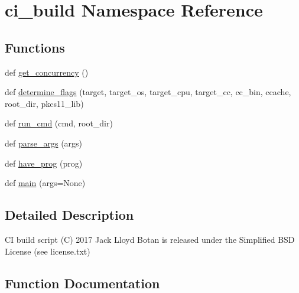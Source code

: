 \hypertarget{namespaceci__build}{}\section{ci\+\_\+build Namespace Reference}
\label{namespaceci__build}
\subsection*{Functions}
\begin{DoxyCompactItemize}
\item 
def \mbox{\hyperlink{namespaceci__build_a81557509babcdd915f3d788bbec4b682}{get\+\_\+concurrency}} ()
\item 
def \mbox{\hyperlink{namespaceci__build_ad0ad5f2f7af946645668841adc023d18}{determine\+\_\+flags}} (target, target\+\_\+os, target\+\_\+cpu, target\+\_\+cc, cc\+\_\+bin, ccache, root\+\_\+dir, pkcs11\+\_\+lib)
\item 
def \mbox{\hyperlink{namespaceci__build_a40b9f44a6a3669741ef2a37fa056f19e}{run\+\_\+cmd}} (cmd, root\+\_\+dir)
\item 
def \mbox{\hyperlink{namespaceci__build_aa28115b3f14a76c39748bf34ec2f92f4}{parse\+\_\+args}} (args)
\item 
def \mbox{\hyperlink{namespaceci__build_ac75d86cb2f5840433b6c90ced39febc1}{have\+\_\+prog}} (prog)
\item 
def \mbox{\hyperlink{namespaceci__build_a13eee9a40af248919a1ecdbd4ff144d4}{main}} (args=None)
\end{DoxyCompactItemize}


\subsection{Detailed Description}
\begin{DoxyVerb}CI build script
(C) 2017 Jack Lloyd
Botan is released under the Simplified BSD License (see license.txt)
\end{DoxyVerb}
 

\subsection{Function Documentation}
\mbox{\label{namespaceci__build_ad0ad5f2f7af946645668841adc023d18}} 
